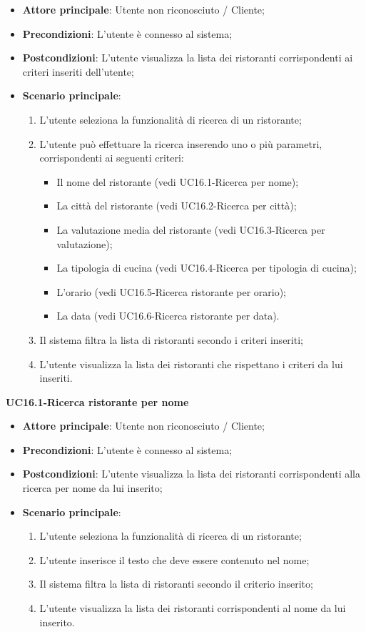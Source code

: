 \begin{itemize}
\item \textbf{Attore principale}: Utente non riconosciuto / Cliente;
\item \textbf{Precondizioni}: L'utente è connesso al sistema;
\item \textbf{Postcondizioni}: L'utente visualizza la lista dei ristoranti corrispondenti ai criteri inseriti dell'utente;
\item \textbf{Scenario principale}:
\begin{enumerate}
\item L'utente seleziona la funzionalità di ricerca di un ristorante;
\item L'utente può effettuare la ricerca inserendo uno o più parametri, corrispondenti ai seguenti criteri:
\begin{itemize}
\item Il nome del ristorante (vedi UC16.1-Ricerca per nome);
\item La città del ristorante (vedi UC16.2-Ricerca per città);
\item La valutazione media del ristorante (vedi UC16.3-Ricerca per valutazione);
\item La tipologia di cucina (vedi UC16.4-Ricerca per tipologia di cucina);
\item L'orario (vedi UC16.5-Ricerca ristorante per orario);
\item La data (vedi UC16.6-Ricerca ristorante per data).
\end{itemize}
\item Il sistema filtra la lista di ristoranti secondo i criteri inseriti;
\item L'utente visualizza la lista dei ristoranti che rispettano i criteri da lui inseriti.
\end{enumerate}
\end{itemize}

\pagebreak
\textbf{UC16.1-Ricerca ristorante per nome}

\begin{itemize}
\item \textbf{Attore principale}: Utente non riconosciuto / Cliente;
\item \textbf{Precondizioni}: L'utente è connesso al sistema;
\item \textbf{Postcondizioni}: L'utente visualizza la lista dei ristoranti corrispondenti alla ricerca per nome da lui inserito;
\item \textbf{Scenario principale}:
\begin{enumerate}
\item L'utente seleziona la funzionalità di ricerca di un ristorante;
\item L'utente inserisce il testo che deve essere contenuto nel nome;
\item Il sistema filtra la lista di ristoranti secondo il criterio inserito;
\item L'utente visualizza la lista dei ristoranti corrispondenti al nome da lui inserito.
\end{enumerate}
\end{itemize}


